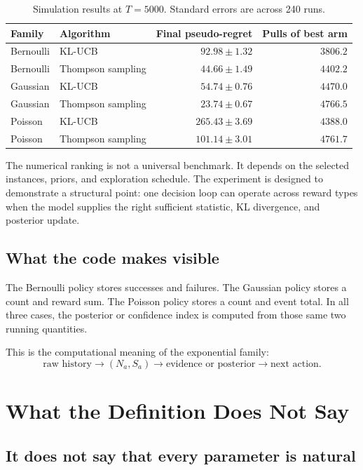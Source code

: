 \documentclass[en,nofont,11pt]{elegantbook}
\begin{document}
\begin{table}[H]
\centering
\caption{Simulation results at $T=5000$. Standard errors are across 240 runs.}
\begin{tabular}{llrr}
\toprule
Family & Algorithm & Final pseudo-regret & Pulls of best arm \\
\midrule
Bernoulli & KL-UCB & $92.98\pm1.32$ & $3806.2$ \\
Bernoulli & Thompson sampling & $44.66\pm1.49$ & $4402.2$ \\
Gaussian & KL-UCB & $54.74\pm0.76$ & $4470.0$ \\
Gaussian & Thompson sampling & $23.74\pm0.67$ & $4766.5$ \\
Poisson & KL-UCB & $265.43\pm3.69$ & $4388.0$ \\
Poisson & Thompson sampling & $101.14\pm3.01$ & $4761.7$ \\
\bottomrule
\end{tabular}
\end{table}

The numerical ranking is not a universal benchmark. It depends on the selected instances, priors, and exploration schedule. The experiment is designed to demonstrate a structural point: one decision loop can operate across reward types when the model supplies the right sufficient statistic, KL divergence, and posterior update.

\section{What the code makes visible}

The Bernoulli policy stores successes and failures. The Gaussian policy stores a count and reward sum. The Poisson policy stores a count and event total. In all three cases, the posterior or confidence index is computed from those same two running quantities.

This is the computational meaning of the exponential family:
\[
\boxed{
\text{raw history}
\longrightarrow
(N_a,S_a)
\longrightarrow
\text{evidence or posterior}
\longrightarrow
\text{next action}.
}
\]

\chapter{What the Definition Does Not Say}

\section{It does not say that every parameter is natural}
\end{document}
